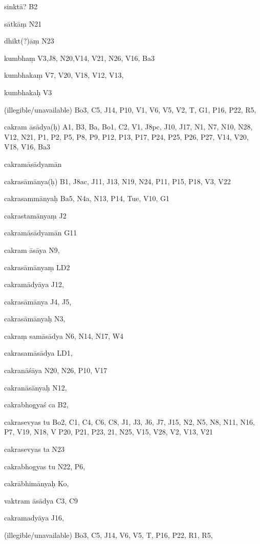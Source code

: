 \begin{ekdosis}
\begin{marma}[hp01_055]
\begin{marma}[hp02_009]
\begin{marma}[hp02_011]
\begin{marma}[hp02_54a]
\item[sinktā?] B2
\item[sātkāṃ] N21
\item[dhikt(?)āṃ] N23
\item[kumbhaṃ] V3,J8, N20,V14, V21, N26, V16, Ba3 
\item[kumbhakaṃ] V7, V20, V18, V12, V13, 
\item[kumbhakaḥ] V3
\item[(illegible/unavailable)] Bo3, C5, J14, P10, V1, V6, V5, V2, T, G1, P16, P22, R5,
  \begin{description}

    \end{description}
 \end{marma}


 \begin{marma}[hp02_55a]
\item[cakram āsādya(ḥ)] A1, B3, Ba, Bo1, C2, V1, J8pc, J10, J17, N1, N7, N10, N28, V12,
 N21, P1, P2, P5, P8, P9, P12, P13, P17, P24, P25, P26, P27, V14, V20, V18, V16, Ba3
\item[cakramāsādyamān] 
\item[cakrasāmānya(ḥ)] B1, J8ac, J11, J13, N19, N24, P11, P15, P18, V3, V22
\item[cakrasammānyaḥ] Ba5, N4a, N13, P14, Tue, V10, G1
\item[cakrastamānyaṃ] J2
\item[cakramāsādyamān] G11
\item[cakram āsāya] N9,
\item[cakrasāmānyaṃ] LD2
\item[cakramādyāya] J12,
\item[cakrasāmānya] J4, J5,
\item[cakrasāmānyaḥ] N3, 
\item[cakraṃ samāsādya] N6, N14, N17, W4
\item[cakrasamāsādya] LD1,
\item[cakranāśāya] N20, N26, P10, V17
\item[cakranāsānyaḥ] N12, 
\item[cakrabhogyaś ca] B2,
\item[cakrasevyas tu] Bo2, C1, C4, C6, C8, J1, J3, J6, J7, J15, N2, N5, N8, N11, N16, P7, V19, N18, V P20, P21, P23, 21, N25, V15, V28, V2, V13, V21
\item[cakrasevyas ta] N23
\item[cakrabhogyas tu] N22, P6, 
\item[cakrābhimānyaḥ] Ko,
\item[vaktram āsādya] C3, C9
\item[cakramadyāya] J16,
\item[(illegible/unavailable)] Bo3, C5, J14, V6, V5, T, P16, P22, R1, R5,
  \begin{description}


\end{description}
\end{marma}
\end{marma}
\end{marma}
\end{marma}
\end{ekdosis}
